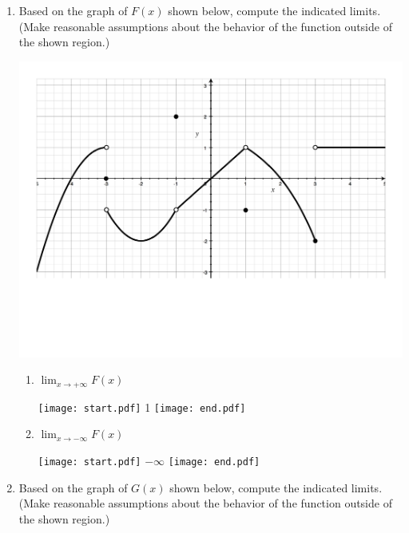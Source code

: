 \documentclass[12pt]{article}
\begin{document}
\begin{enumerate}

\item Based on the graph of $F(x)$ shown below, compute the indicated limits.  (Make reasonable assumptions about the behavior of the function outside of the shown region.)

\begin{center}
\includegraphics[scale=0.5]{Limits1.pdf}
\end{center}

\begin{enumerate}

\item $\displaystyle \lim_{x \rightarrow +\infty}{F(x)}$

\texttt{[image: start.pdf]}
{{1}}
\texttt{[image: end.pdf]}


\item $\displaystyle \lim_{x \rightarrow -\infty}{F(x)}$

\texttt{[image: start.pdf]}
{{$-\infty$}}
\texttt{[image: end.pdf]}


\end{enumerate}

\newpage

\item Based on the graph of $G(x)$ shown below, compute the indicated limits.  (Make reasonable assumptions about the behavior of the function outside of the shown region.)


\end{enumerate}
\end{document}
